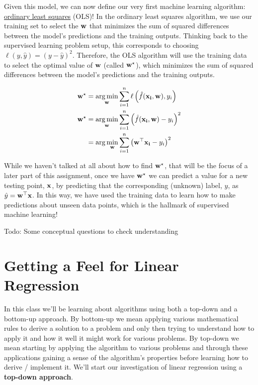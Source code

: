 \documentclass{tufte-handout}
\begin{document}
Given this model, we can now define our very first machine learning algorithm: \href{https://en.wikipedia.org/wiki/Ordinary_least_squares}{ordinary least squares} (OLS)!  In the ordinary least squares algorithm, we use our training set to select the $\mathbf{w}$ that minimizes the sum of squared differences between the model's predictions and the training outputs.  Thinking back to the supervised learning problem setup, this corresponds to choosing $\ell(y, \hat{y}) = (y - \hat{y})^2$.
Therefore, the OLS algorithm will use the training data to select the optimal value of $\mathbf{w}$ (called $\mathbf{w}^\star$), which minimizes the sum of squared differences between the model's predictions and the training outputs.

\begin{align}
\mathbf{w}^\star &= \operatorname*{arg\,min}_{\mathbf{w}} \sum_{i=1}^n \ell \left ( \hat{f}(\mathbf{x_i}, \mathbf{w}) , y_i \right) \\
\mathbf{w}^\star &= \operatorname*{arg\,min}_{\mathbf{w}} \sum_{i=1}^n \left ( \hat{f}(\mathbf{x_i}, \mathbf{w}) - y_i \right)^2 \\
&= \arg\min_{\mathbf{w}} \sum_{i=1}^n \left ( \mathbf{w}^\top \mathbf{x_i} - y_i \right)^2
\end{align}

While we haven't talked at all about how to find $\mathbf{w}^\star$, that will be the focus of a later part of this assignment, once we have $\mathbf{w}^\star$ we can predict a value for a new testing point, $\mathbf{x}$, by predicting that the corresponding (unknown) label, $y$, as $\hat{y} = \mathbf{w}^\top \mathbf{x}$.  In this way, we have used the training data to learn how to make predictions about unseen data points, which is the hallmark of supervised machine learning!

\begin{exercise}
Todo: Some conceptual questions to check understanding
\end{exercise}

\section{Getting a Feel for Linear Regression}
In this class we'll be learning about algorithms using both a top-down and a bottom-up approach.  By bottom-up we mean applying various mathematical rules to derive a solution to a problem and only then trying to understand how to apply it and how it well it might work for various problems.  By top-down we mean starting by applying the algorithm to various problems and through these applications gaining a sense of the algorithm's properties before learning how to derive / implement it.  We'll start our investigation of linear regression using a \textbf{top-down approach}.
\end{document}

